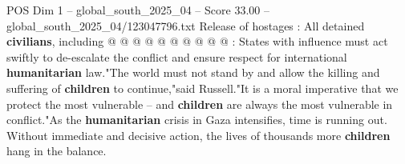 \begin{textsample}{POS Dim 1 – global\_south\_2025\_04 – Score 33.00 – global\_south\_2025\_04/123047796.txt}
Release of hostages : All detained \textbf{civilians}, including @ @ @ @ @ @ @ @ @ @ : States with influence must act swiftly to de-escalate the conflict and ensure respect for international \textbf{humanitarian} law."The world must not stand by and allow the killing and suffering of \textbf{children} to continue,"said Russell."It is a moral imperative that we protect the most vulnerable -- and \textbf{children} are always the most vulnerable in conflict."As the \textbf{humanitarian} crisis in Gaza intensifies, time is running out.
Without immediate and decisive action, the lives of thousands more \textbf{children} hang in the balance.

\end{textsample}
